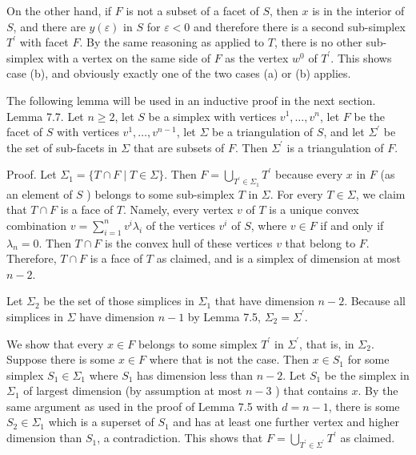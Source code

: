 \documentclass[12pt]{article}
\begin{document}
On the other hand, if $F$ is not a subset of a facet of $S$, then $x$ is in the interior of $S$, and there are $y(\varepsilon)$ in $S$ for $\varepsilon<0$ and therefore there is a second sub-simplex $T^{\prime}$ with facet $F$. By the same reasoning as applied to $T$, there is no other sub-simplex with a vertex on the same side of $F$ as the vertex $w^{0}$ of $T^{\prime}$. This shows case (b), and obviously exactly one of the two cases (a) or (b) applies.

The following lemma will be used in an inductive proof in the next section.\\
Lemma 7.7. Let $n \geq 2$, let $S$ be a simplex with vertices $v^{1}, \ldots, v^{n}$, let $F$ be the facet of $S$ with vertices $v^{1}, \ldots, v^{n-1}$, let $\Sigma$ be a triangulation of $S$, and let $\Sigma^{\prime}$ be the set of sub-facets in $\Sigma$ that are subsets of $F$. Then $\Sigma^{\prime}$ is a triangulation of $F$.

Proof. Let $\Sigma_{1}=\{T \cap F \mid T \in \Sigma\}$. Then $F=\bigcup_{T^{\prime} \in \Sigma_{1}} T^{\prime}$ because every $x$ in $F$ (as an element of $S$ ) belongs to some sub-simplex $T$ in $\Sigma$. For every $T \in \Sigma$, we claim that $T \cap F$ is a face of $T$. Namely, every vertex $v$ of $T$ is a unique convex combination $v=\sum_{i=1}^{n} v^{i} \lambda_{i}$ of the vertices $v^{i}$ of $S$, where $v \in F$ if and only if $\lambda_{n}=0$. Then $T \cap F$ is the convex hull of these vertices $v$ that belong to $F$. Therefore, $T \cap F$ is a face of $T$ as claimed, and is a simplex of dimension at most $n-2$.

Let $\Sigma_{2}$ be the set of those simplices in $\Sigma_{1}$ that have dimension $n-2$. Because all simplices in $\Sigma$ have dimension $n-1$ by Lemma 7.5, $\Sigma_{2}=\Sigma^{\prime}$.

We show that every $x \in F$ belongs to some simplex $T^{\prime}$ in $\Sigma^{\prime}$, that is, in $\Sigma_{2}$. Suppose there is some $x \in F$ where that is not the case. Then $x \in S_{1}$ for some simplex $S_{1} \in \Sigma_{1}$ where $S_{1}$ has dimension less than $n-2$. Let $S_{1}$ be the simplex in $\Sigma_{1}$ of largest dimension (by assumption at most $n-3$ ) that contains $x$. By the same argument as used in the proof of Lemma 7.5 with $d=n-1$, there is some $S_{2} \in \Sigma_{1}$ which is a superset of $S_{1}$ and has at least one further vertex and higher dimension than $S_{1}$, a contradiction. This shows that $F=\bigcup_{T^{\prime} \in \Sigma^{\prime}} T^{\prime}$ as claimed.
\end{document}
